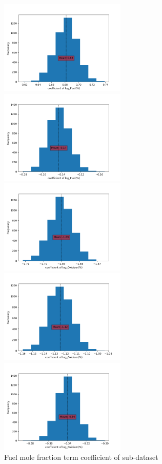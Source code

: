 \documentclass[preprint,12pt]{elsarticle}
\begin{document}
\begin{figure}[H]
\begin{multicols}{3}
				    		\includegraphics[width=6cm]{logFuel1.png}\par 
				    		\includegraphics[width=6cm]{logFuel2.png}\par 
				    	\end{multicols}
				    	\caption{Fuel mole fraction term coefficient of sub-dataset}				  	
				    	\begin{multicols}{3}
				    		\includegraphics[width=6cm]{logOxidizer0.png}\par 
				    		\includegraphics[width=6cm]{logOxidizer1.png}\par 
				    		\includegraphics[width=6cm]{logOxidizer2.png}\par 

\end{multicols}
\end{figure}
\end{document}
